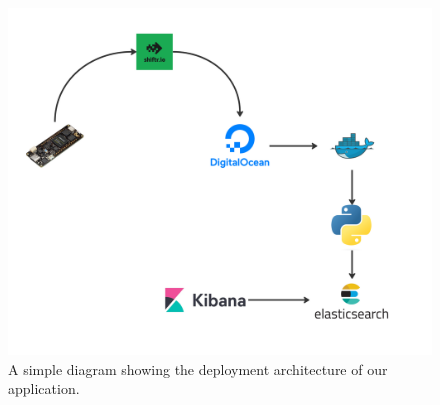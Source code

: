 \begin{figure}[H]
    \centering
    \includegraphics[width=\textwidth]{../assets/png/solar-station-arch.jpg}
    \caption{A simple diagram showing the deployment architecture of our application.}
    \label{fig:do}
\end{figure}\